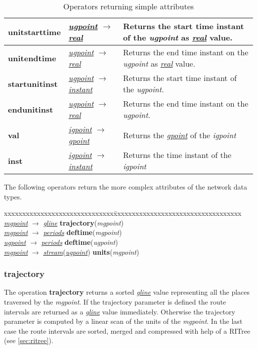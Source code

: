 \documentclass[a4paper]{article}
\newcommand{\op}[1]{\textbf{#1}}
\newcommand{\var}[1]{\textsl{#1}}
\newcommand{\dt}[1]{\textsl{\underline{#1}}}
\begin{document}
\begin{table}[H]
\begin{scriptsize}
\begin{tabular}{|l|l|p{10cm}|}
\hline
\op{unitstarttime}&\dt{ugpoint} $\rightarrow$ \dt{real}& Returns the start time instant of the \var{ugpoint} as \dt{real} value.\\
\hline
\op{unitendtime}&\dt{ugpoint} $\rightarrow$ \dt{real} & Returns the end time instant on the \var{ugpoint} as \dt{real} value.\\
\hline
\op{startunitinst}&\dt{ugpoint} $\rightarrow$ \dt{instant}& Returns the start time instant of the \var{ugpoint}.\\
\hline
\op{endunitinst}&\dt{ugpoint} $\rightarrow$ \dt{real} & Returns the end time instant on the \var{ugpoint}.\\
\hline
\op{val}&\dt{igpoint} $\rightarrow$ \dt{gpoint} & Returns the \dt{gpoint} of the \var{igpoint} \\
\hline
\op{inst}&\dt{igpoint} $\rightarrow$ \dt{instant}& Returns the time instant of the \var{igpoint}\\
\hline
\end{tabular}
\end{scriptsize}
\caption{Operators returning simple attributes}
\label{tab:simpleop}
\end{table}
The following operators return the more complex attributes of the network data types.
\begin{tabbing}
xxxxxxxxxxxxxxxxxxxxxxxxxxxxxx\=xxxxxxxxxxxxxxxxxxxxxxxxxxxxxxxxxxx\kill
\dt{mgpoint} $\rightarrow$ \dt{gline} \> \op{trajectory}(\var{mgpoint})\\
\dt{mgpoint} $\rightarrow$ \dt{periods} \> \op{deftime}(\var{mgpoint})\\
\dt{ugpoint} $\rightarrow$ \dt{periods} \> \op{deftime}(\var{ugpoint})\\
\dt{mgpoint} $\rightarrow$ \dt{stream}(\dt{ugpoint}) \> \op{units}(\var{mgpoint})\\
\end{tabbing}
\subsubsection{\op{trajectory}}
The operation \op{trajectory} returns a sorted \dt{gline} value representing all the places traversed by the \var{mgpoint}. If the trajectory parameter is defined the route intervals are returned as a \dt{gline} value immediately. Otherwise the trajectory parameter is computed by a linear scan of the units of the \var{mgpoint}. In the last case the route intervals are sorted, merged and compressed with help of a RITree (see \ref{sec:ritree}).
\end{document}

